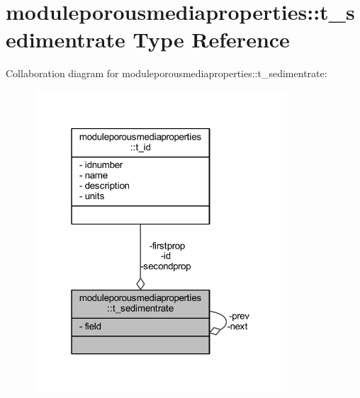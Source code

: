 \hypertarget{structmoduleporousmediaproperties_1_1t__sedimentrate}{}\section{moduleporousmediaproperties\+:\+:t\+\_\+sedimentrate Type Reference}
\label{structmoduleporousmediaproperties_1_1t__sedimentrate}


Collaboration diagram for moduleporousmediaproperties\+:\+:t\+\_\+sedimentrate\+:\nopagebreak
\begin{figure}[H]
\begin{center}
\leavevmode
\includegraphics[width=268pt]{structmoduleporousmediaproperties_1_1t__sedimentrate__coll__graph}
\end{center}
\end{figure}
